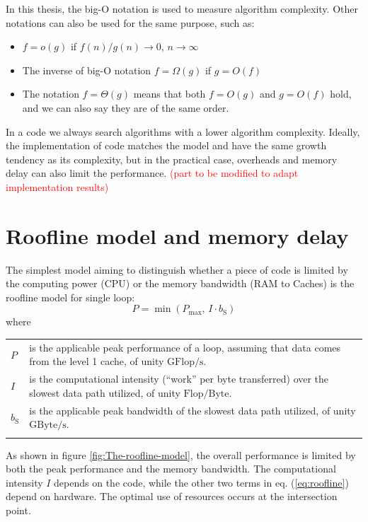 In this thesis, the big-O notation is used to measure algorithm complexity.
Other notations can also be used for the same purpose, such as:
\begin{itemize}
\item $f=o(g)$ if $f(n)/g(n)\rightarrow0$, $n\rightarrow\infty$
\item The inverse of big-O notation $f=\Omega(g)$ if $g=O(f)$
\item The notation $f=\Theta(g)$ means that both $f=O(g)$ and $g=O(f)$
hold, and we can also say they are of the same order.
\end{itemize}
In a code we always search algorithms with a lower algorithm complexity.
Ideally, the implementation of code matches the model and have the
same growth tendency as its complexity, but in the practical case,
overheads and memory delay can also limit the performance. \textcolor{red}{(part
to be modified to adapt implementation results)}


\section{Roofline model and memory delay}

The simplest model aiming to distinguish whether a piece of code is
limited by the computing power (CPU) or the memory bandwidth (RAM
to Caches) is the roofline model \citep{Williams_2009_roofline} for
single loop:
\begin{equation}
P=\min\left(P_{\max},\,I\cdot b_{\mathrm{S}}\right)\label{eq:roofline}
\end{equation}
where

\begin{tabular}{l>{\raggedright}p{}}
$P$ & is the applicable peak performance of a loop, assuming that data comes
from the level 1 cache, of unity $\mathrm{GFlop/s}$. \tabularnewline
$I$ & is the computational intensity (“work” per byte transferred) over
the slowest data path utilized, of unity $\mathrm{Flop/Byte}$. \tabularnewline
$b_{\mathrm{S}}$ & is the applicable peak bandwidth of the slowest data path utilized,
of unity $\mathrm{GByte/s}$.\tabularnewline
 & \tabularnewline
\end{tabular}

As shown in figure \ref{fig:The-roofline-model}, the overall performance
is limited by both the peak performance and the memory bandwidth.
The computational intensity $I$ depends on the code, while the other
two terms in eq. (\ref{eq:roofline}) depend on hardware. The optimal
use of resources occurs at the intersection point.

